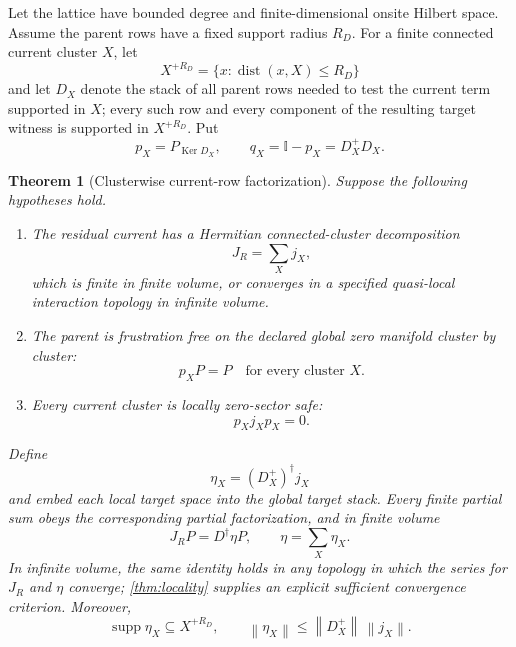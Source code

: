 \documentclass[11pt]{article}
\newtheorem{theorem}{Theorem}[section]
\theoremstyle{definition}
\theoremstyle{remark}
\newcommand{\Ker}{\operatorname{Ker}}
\newcommand{\dist}{\operatorname{dist}}
\newcommand{\Id}{\mathbb I}
\newcommand{\norm}[1]{\left\lVert #1\right\rVert}
\newcommand{\supp}{\operatorname{supp}}
\begin{document}
Let the lattice have bounded degree and finite-dimensional onsite Hilbert space.  Assume the parent rows have a fixed support radius $R_D$.  For a finite connected current cluster $X$, let
\[
 X^{+R_D}=\{x:\dist(x,X)\le R_D\}
\]
and let $D_X$ denote the stack of all parent rows needed to test the current term supported in $X$; every such row and every component of the resulting target witness is supported in $X^{+R_D}$.  Put
\begin{equation}
 p_X=P_{\Ker D_X},
 \qquad q_X=\Id-p_X=D_X^+D_X.
 \label{eq:pxqx}
\end{equation}

\begin{theorem}[Clusterwise current-row factorization]
\label{thm:clusterfactor}
Suppose the following hypotheses hold.
\begin{enumerate}[label=\textup{(H\arabic*)}]
\item The residual current has a Hermitian connected-cluster decomposition
\begin{equation}
 J_R=\sum_Xj_X,
 \label{eq:Jclusters}
\end{equation}
which is finite in finite volume, or converges in a specified quasi-local interaction topology in infinite volume.
\item The parent is frustration free on the declared global zero manifold cluster by cluster:
\begin{equation}
 \boxed{p_XP=P\quad\text{for every cluster }X.}
 \label{eq:localFF}
\end{equation}
\item Every current cluster is locally zero-sector safe:
\begin{equation}
 \boxed{p_Xj_Xp_X=0.}
 \label{eq:localcurrentsafe}
\end{equation}
\end{enumerate}
Define
\begin{equation}
 \eta_X=(D_X^+)^\dagger j_X
 \label{eq:etaX}
\end{equation}
and embed each local target space into the global target stack.  Every finite partial sum obeys the corresponding partial factorization, and in finite volume
\begin{equation}
 \boxed{J_RP=D^\dagger\eta P,\qquad \eta=\sum_X\eta_X.}
 \label{eq:globalclusterfactor}
\end{equation}
In infinite volume, the same identity holds in any topology in which the series for $J_R$ and $\eta$ converge; \cref{thm:locality} supplies an explicit sufficient convergence criterion.  Moreover,
\begin{equation}
 \supp\eta_X\subseteq X^{+R_D},
 \qquad
 \norm{\eta_X}\le\norm{D_X^+}\,\norm{j_X}.
 \label{eq:etaXnorm}
\end{equation}
\end{theorem}
\end{document}
